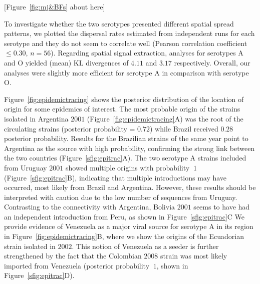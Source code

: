 \documentclass[10pt]{article}
\begin{document}
\begin{center}
 [Figure~\ref{fig:mj&BFs} about here]
\end{center}

To investigate whether the two serotypes presented different spatial spread patterns, we plotted the dispersal rates estimated from independent runs for each serotype and they do not seem to correlate well (Pearson correlation coefficient $\leq 0.30$, $n = 56$).
Regarding spatial signal extraction, analyses for serotypes  A and O yielded (mean) KL divergences of $4.11$ and $3.17$ respectively.
Overall, our analyses were slightly more efficient for serotype A in comparison with serotype O.


Figure~\ref{fig:epidemictracing} shows the posterior distribution of the  location of origin for some epidemics of interest.
The most probable origin of the strains isolated in Argentina $2001$ (Figure~\ref{fig:epidemictracing}A) was the root of the circulating strains (posterior probability = $0.72$) while Brazil received $0.28$ posterior probability.
Results for the Brazilian strains of the same year point to  Argentina as the source with high probability, confirming the strong link between the two countries (Figure~\ref{sfig:epitrac}A).
The two serotype A strains included from Uruguay $2001$ showed multiple origins with probability $~1$ (Figure~\ref{sfig:epitrac}B), indicating that multiple introductions may have occurred, most likely from Brazil and Argentina.
However, these results should be interpreted with caution due to the low number of sequences from Uruguay.
Contrasting to the connectivity with Argentina, Bolivia $2001$ seems to have had an independent introduction from Peru, as shown in Figure~\ref{sfig:epitrac}C
We provide evidence of Venezuela as a major viral source for serotype A in its region in Figure~\ref{fig:epidemictracing}B, where we show the origins of the Ecuadorian strain isolated in $2002$.
This notion of Venezuela as a seeder is further strengthened by the fact that the Colombian $2008$ strain was most likely imported from Venezuela (posterior probability $~1$, shown in Figure~\ref{sfig:epitrac}D).
\end{document}

